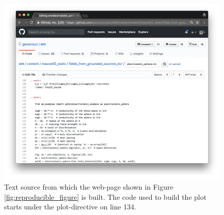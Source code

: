 \begin{figure}
    \begin{center}
    \includegraphics[width=\textwidth]{figures/education/reproducible_figure_source.png}
    \end{center}
\caption{
    Text source from which the web-page shown in Figure \ref{fig:reproducible_figure} is built.
    The code used to build the plot starts under the plot-directive on line 134.
}
\label{fig:reproducible_figure_source}
\end{figure}



